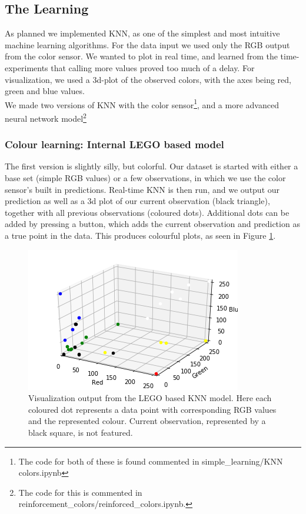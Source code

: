 \documentclass[11pt, a4paper]{article}
\begin{document}
\subsection{The Learning}
As planned we implemented KNN, as one of the simplest and most intuitive machine learning algorithms. For the data input we used only the RGB output from the color sensor. We wanted to plot in real time, and learned from the time-experiments that calling more values proved too much of a delay. For visualization, we used a 3d-plot of the observed colors, with the axes being red, green and blue values. \\
We made two versions of KNN with the color sensor\footnote{The code for both of these is found commented in simple\_learning/KNN colors.ipynb}, and a more advanced neural network model\footnote{The code for this is commented in reinforcement\_colors/reinforced\_colors.ipynb.}
\subsubsection{Colour learning: Internal LEGO based model}
The first version is slightly silly, but colorful. Our dataset is started with either a base set (simple RGB values) or a few observations, in which we use the color sensor's built in predictions. Real-time KNN is then run, and we output our prediction as well as a 3d plot of our current observation (black triangle), together with all previous observations (coloured dots). Additional dots can be added by pressing a button, which adds the current observation and prediction as a true point in the data. This produces colourful plots, as seen in Figure \ref{fig:colour_KNN_LEGO}. \\
\begin{figure}[H]
	\centering
	\includegraphics[scale=1]{images/ColourKNNversion1.png} 	
	\caption{Visualization output from the LEGO based KNN model. Here each coloured dot represents a data point with corresponding RGB values and the represented colour. Current observation, represented by a black square, is not featured.}
	\label{fig:colour_KNN_LEGO}
\end{figure}
\end{document}
